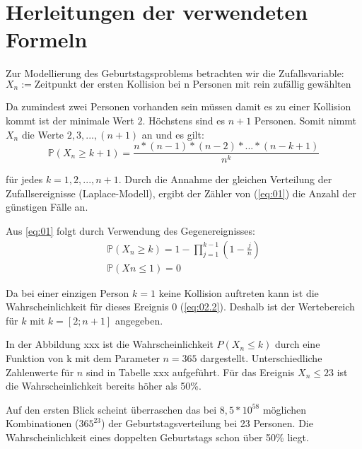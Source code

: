 \documentclass[../main.tex]{subfiles}
\begin{document}
\section{Herleitungen der verwendeten Formeln}
\begin{flushleft}
Zur Modellierung des Geburtstagsproblems betrachten wir die Zufallsvariable:
    \begin{equation}
      X_{ n } := \text{Zeitpunkt der ersten Kollision bei n Personen mit rein zufällig gewählten Geburtstagen} \label {first}
    \end{equation}




Da zumindest zwei Personen vorhanden sein müssen damit es zu einer Kollision kommt ist der minimale Wert $2$. Höchstens sind es $n + 1$ Personen. Somit nimmt $X_{ n }$ die Werte $2,3,... ,(n+1)$ an und es gilt:
   \begin{equation}  \label{eq:01}
   \mathbb{P}(X_{ n } \geq k + 1)  = \frac{ n * (n - 1) * (n - 2) * ...* (n - k + 1) }{ n^k }
    \end{equation}

für jedes $k = 1,2,...,n + 1$. Durch die Annahme der gleichen Verteilung der Zufallsereignisse (Laplace-Modell), ergibt der Zähler von (\autoref{eq:01}) die Anzahl der günstigen Fälle an. \newline

Aus \autoref{eq:01} folgt durch Verwendung des Gegenereignisses:
\begin{eqnarray}
\mathbb{P}(X_{ n } \geq k) = 1 - \prod_{ j=1 }^{k-1}{ (1 - \frac{ j }{ n }) }  \label{eq:02.1} \\
\mathbb{P}(Xn\leq 1) = 0  \label{eq:02.2}
\end{eqnarray}

Da bei einer einzigen Person $k = 1$ keine Kollision auftreten kann ist die Wahrscheinlichkeit für dieses Ereignis 0 (\autoref{eq:02.2}). Deshalb ist der Wertebereich für $k$ mit $k = [2;n+1]$ angegeben. \newline

In der Abbildung xxx ist die Wahrscheinlichkeit $P(X_{n} \leq k)$ durch eine Funktion von k mit dem Parameter $n = 365$ dargestellt. Unterschiedliche Zahlenwerte für $n$ sind in Tabelle xxx aufgeführt. Für das Ereignis $ X_{n} \leq 23 $ ist die Wahrscheinlichkeit bereits höher als 50\%. \newline

Auf den ersten Blick scheint überraschen das bei $8,5 * 10^{58}$ möglichen Kombinationen ($365^{23}$) der Geburtstagsverteilung bei 23 Personen. Die Wahrscheinlichkeit eines doppelten Geburtstags schon über 50\% liegt. \newline


\end{flushleft}
\end{document}
